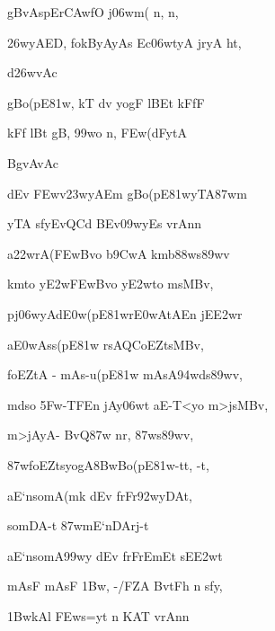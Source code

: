 {\dn gB\0vAspEr\3CAw\?fO j\306wm( n, n,{\dandabdn} \dontdisplaylinenum}

{\dn \326wyAED, fokByAyAs Ec\306wtyA jryA ht, \vegdn\dontdisplaylinenum}

{\dn d\?\326wvAc{\dandabdn}\dontdisplaylinenum }

{\dn gBo{\qvb}(pE\381w, kT\2 d\?v yogF lBEt kFfF \dontdisplaylinenum}

{\dn kFf\2 lBt\? gB\0, \399wo\2 n, \3FEw(dFy\0tA \vegdn\dontdisplaylinenum}

{\dn BgvAvAc{\dandabdn}\dontdisplaylinenum }

{\dn {} d\?Ev \3FEwv\323wyAEm gBo{\qvb}(pE\381wy\0TA\387wm \dontdisplaylinenum}

{\dn yTA s\2fyEvQC\?d\2 BEv\309wyEs vrAnn\? \vegdn\dontdisplaylinenum}

{\dn a\322wrA(\3FEwBvo b\5\39CwA km\0b\388ws\389wv \dontdisplaylinenum}

{\dn km\0to y\3E2w\3FEwBvo y\3E2wto msMBv, \vegdn\dontdisplaylinenum}

{\dn pj\0\306wyAd\3E0w(pE\381wr\3E0wAtAEn jE\3E2wr\?{\dandabdn} \dontdisplaylinenum}

{\dn a\3E0wAss(pE\381w rsAQCoEZtsMBv, \vegdn\dontdisplaylinenum}

{\dn foEZtA {\rs -\re} mA\2s{\rs -\re}u(pE\381w mA\2sA\394w\?ds\389wv,{\dandabdn} \dontdisplaylinenum}

{\dn m\?dso \35Fw-TFEn jAy\306wt\? aE-T<yo m>jsMBv, \vegdn\dontdisplaylinenum}

{\dn m>jAyA- Bv\?Q\387w\2 nr, \387ws\389wv,{\dandabdn} \dontdisplaylinenum}

{\dn {}\387wfoEZts\2yogA\38BwBo{\qvb}(pE\381w-tt, -t, \vegdn\dontdisplaylinenum}

{\dn aE`nsomA(mk\2 d\?Ev frFr\392wyDAt,{\dandabdn} \dontdisplaylinenum}

{\dn somDA-t\2 \387wmE`nDArj-t\dontdisplaylinenum }

{\dn aE`nsomA\399wy\2 d\?Ev frFrEmEt s\2E\3E2wt \vegdn\dontdisplaylinenum}

{\dn mAsF mAsF \31Bw, -/FZA\2 BvtFh n s\2fy,{\dandabdn} \dontdisplaylinenum}

{\dn \31BwkAl\? \3FEws=y\?{\qvb}t n KAT{\rdt} vrAnn\? \vegdn\dontdisplaylinenum}


